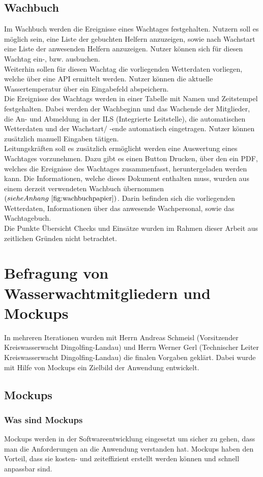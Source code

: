 \documentclass[fontsize=12pt,openright,oneside,paper=a4,BCOR=1cm]{scrbook}
\begin{document}
\subsection{Wachbuch}
Im Wachbuch werden die Ereignisse eines Wachtages festgehalten. Nutzern soll es möglich sein, eine Liste der gebuchten Helfern anzuzeigen, sowie nach Wachstart eine Liste der anwesenden Helfern anzuzeigen. Nutzer können sich für diesen Wachtag ein-, bzw. ausbuchen. \\
Weiterhin sollen für diesen Wachtag die vorliegenden Wetterdaten vorliegen, welche über eine API ermittelt werden. Nutzer können die aktuelle Wassertemperatur über ein Eingabefeld abspeichern. \\
Die Ereignisse des Wachtags werden in einer Tabelle mit Namen und Zeitstempel festgehalten. Dabei werden der Wachbeginn und das Wachende der Mitglieder, die An- und Abmeldung in der ILS (Integrierte Leitstelle), die automatischen Wetterdaten und der Wachstart/ -ende automatisch eingetragen. Nutzer können zusätzlich manuell Eingaben tätigen. \\
Leitungskräften soll es zusätzlich ermöglicht werden eine Auswertung eines Wachtages vorzunehmen. Dazu gibt es einen Button \glqq Drucken\grqq{}, über den ein PDF, welches die Ereignisse des Wachtages zusammenfasst, heruntergeladen werden kann. Die Informationen, welche dieses Dokument enthalten muss, wurden aus einem derzeit verwendeten Wachbuch übernommen $(siehe Anhang ~\ref{fig:wachbuchpapier})$. Darin befinden sich die vorliegenden Wetterdaten, Informationen über das anwesende Wachpersonal, sowie das Wachtagebuch. \\
Die Punkte \glqq Übersicht Checks\grqq{} und \glqq Einsätze\grqq{} wurden im Rahmen dieser Arbeit aus zeitlichen Gründen nicht betrachtet. 

\section{Befragung von Wasserwachtmitgliedern und Mockups}
In mehreren Iterationen wurden mit Herrn Andreas Schmeisl (Vorsitzender Kreiswasserwacht Dingolfing-Landau) und Herrn Werner Gerl (Technischer Leiter Kreiswasserwacht Dingolfing-Landau) die finalen Vorgaben geklärt. Dabei wurde mit Hilfe von Mockups ein Zielbild der Anwendung entwickelt. 
\subsection{Mockups}
\subsubsection{Was sind Mockups}
Mockups werden in der Softwareentwicklung eingesetzt um sicher zu gehen, dass man die Anforderungen an die Anwendung verstanden hat. Mockups haben den Vorteil, dass sie kosten- und zeiteffizient erstellt werden können und schnell anpassbar sind.
\end{document}
